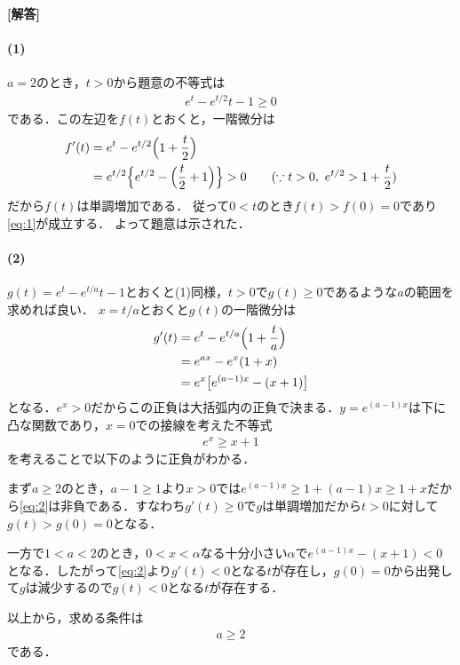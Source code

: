 \documentclass[../../main.tex]{subfiles}
\begin{document}
\begin{oframed}
  
\end{oframed}

{\bf [解答]}
\paragraph{(1)}

$a=2$のとき，$t>0$から題意の不等式は
\begin{align}
  e^t-e^{t/2}t-1\ge0 \label{eq:1}
\end{align}
である．この左辺を$f(t)$とおくと，一階微分は
\begin{align}
  f'(t)
  &=e^t-e^{t/2}\Bigl(1+\dfrac{t}{2}\Bigr) \\
  &=e^{t/2}\Bigl\{e^{t/2}-\Bigl(\dfrac{t}{2}+1\Bigr)\Bigr\}>0\qquad(\because t>0,\ e^{t/2}>1+\dfrac{t}{2})
\end{align}
だから$f(t)$は単調増加である．
従って$0<t$のとき$f(t)>f(0)=0$であり\cref{eq:1}が成立する．
よって題意は示された．

\paragraph{(2)}

$g(t)=e^t-e^{t/a}t-1$とおくと(1)同様，$t>0$で$g(t)\ge0$であるような$a$の範囲を求めれば良い．
$x=t/a$とおくと$g(t)$の一階微分は
\begin{align}
  g'(t)
  &=e^t-e^{t/a}\Bigl(1+\dfrac{t}{a}\Bigr) \\
  &=e^{ax}-e^x(1+x) \\
  &=e^x\bigl[e^{(a-1)x}-(x+1)\bigr] \label{eq:2}
\end{align}
となる．$e^{x}>0$だからこの正負は大括弧内の正負で決まる．$y=e^{(a-1)x}$は下に凸な関数であり，$x=0$での接線を考えた不等式
\begin{align}
  e^{x} \ge x + 1
\end{align}
を考えることで以下のように正負がわかる．

まず$a\ge2$のとき，$a-1\ge 1$より$x>0$では$e^{(a-1)x}\ge1+(a-1)x\ge1+x$だから\cref{eq:2}は非負である．すなわち$g'(t)\ge0$で$g$は単調増加だから$t>0$に対して$g(t)>g(0)=0$となる．

一方で$1<a<2$のとき，$0<x<\alpha$なる十分小さい$\alpha$で$e^{(a-1)x}-(x+1)<0$となる．したがって\cref{eq:2}より$g'(t)<0$となる$t$が存在し，$g(0)=0$から出発して$g$は減少するので$g(t)<0$となる$t$が存在する．

以上から，求める条件は
\begin{align}
  a\ge 2
\end{align}
である．

\newpage
\end{document}

